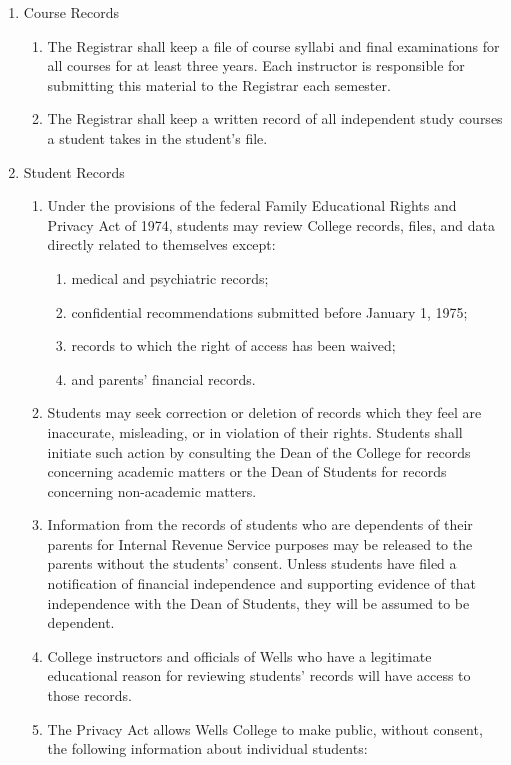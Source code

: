 \documentclass{manual}
\newcommand{\itemLevelA}{\alph*.}
\newcommand{\itemLevelB}{\arabic*)}
\newcommand{\itemRefA}{\alph*}
\newcommand{\itemRefB}{\arabic*}
\begin{document}
	\begin{enumerate}[label=\itemLevelA,ref=\itemRefA]
	\item Course Records

		\begin{enumerate}[label=\itemLevelB,ref=\itemRefB]
		\item The Registrar shall keep a file of course syllabi  and final examinations for all courses for at least three years. Each instructor is responsible for submitting this material to the Registrar each semester.
		\item The Registrar  shall keep a written record of all independent study courses a student takes in the student's file.
		\end{enumerate}
	
	\item Student Records

		\begin{enumerate}[label=\itemLevelB,ref=\itemRefB]
		\item Under the provisions of the federal Family Educational Rights and Privacy Act of 1974, students may review College records, files, and data directly related to themselves except: 

			\begin{enumerate}[label=\alph*)]
			\item medical and psychiatric records; 
			\item confidential recommendations submitted before January 1, 1975;
			\item records to which the right of access has been waived; 
			\item and parents' financial records.
			\end{enumerate}
	
		\item Students may seek correction or deletion of records which they feel are inaccurate, misleading, or in violation of their rights. Students shall initiate such action by consulting the Dean of the College for records concerning academic matters or the Dean of Students for records concerning non-academic matters.
		\item Information from the records of students who are dependents of their parents for Internal Revenue Service purposes may be released to the parents without the students' consent. Unless students have filed a notification of financial independence and supporting evidence of that independence with the Dean of Students, they will be assumed to be dependent.
		\item College instructors and officials of Wells who have a legitimate educational reason for reviewing students' records will have access to those records.
		\item The Privacy Act allows Wells College to make public, without consent, the following information about individual students:


\end{enumerate}
\end{enumerate}
\end{document}
